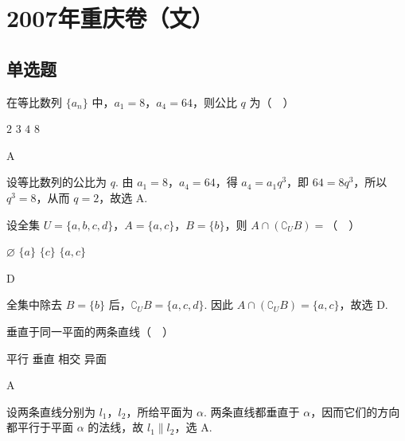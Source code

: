 \chapter{2007年重庆卷（文）}

\section{单选题}

\begin{problem}
在等比数列 \(\{a_{n}\}\) 中，\(a_{1} = 8\)，\(a_{4} = 64\)，则公比 \(q\) 为（\(\quad\)）

\choices
    {\(2\)}
    {\(3\)}
    {\(4\)}
    {\(8\)}
\end{problem}

\begin{answer}
A
\end{answer}

\begin{solution}
设等比数列的公比为 \(q\). 由 \(a_1=8\)，\(a_4=64\)，得 \(a_4=a_1q^3\)，即 \(64=8q^3\)，所以 \(q^3=8\)，从而 \(q=2\)，故选 A.
\end{solution}

\begin{problem}
设全集 \( U = \{a, b, c, d\} \)，\( A = \{a, c\} \)，\( B = \{b\} \)，则 \( A \cap (\complement_U B) = \)（\(\quad\)）

\choices
    {\( \varnothing \)}
    {\( \{a\} \)}
    {\( \{c\} \)}
    {\( \{a, c\} \)}
\end{problem}

\begin{answer}
D
\end{answer}

\begin{solution}
全集中除去 \(B=\{b\}\) 后，\(\complement_U B=\{a,c,d\}\). 因此 \(A\cap(\complement_U B)=\{a,c\}\)，故选 D.
\end{solution}

\begin{problem}
垂直于同一平面的两条直线（\(\quad\)）

\choices
    {平行}
    {垂直}
    {相交}
    {异面}
\end{problem}

\begin{answer}
A
\end{answer}

\begin{solution}
设两条直线分别为 \(l_1\)，\(l_2\)，所给平面为 \(\alpha\). 两条直线都垂直于 \(\alpha\)，因而它们的方向都平行于平面 \(\alpha\) 的法线，故 \(l_1\parallel l_2\)，选 A.
\end{solution}

